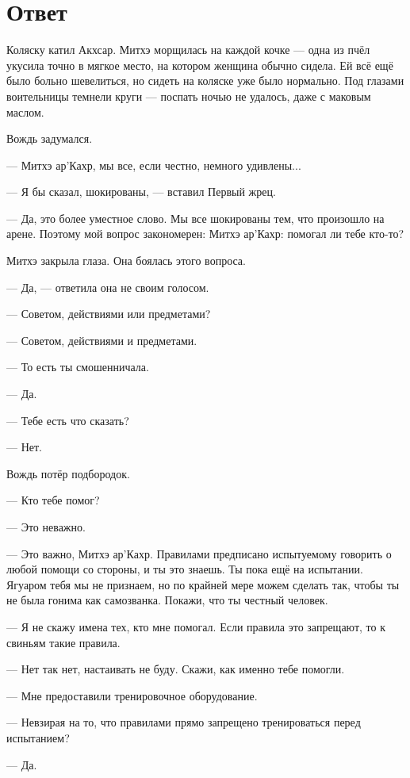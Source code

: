 \section{Ответ}

Коляску катил Акхсар.
Митхэ морщилась на каждой кочке --- одна из пчёл укусила точно в мягкое место, на котором женщина обычно сидела.
Ей всё ещё было больно шевелиться, но сидеть на коляске уже было нормально.
Под глазами воительницы темнели круги --- поспать ночью не удалось, даже с маковым маслом.

\textspace

Вождь задумался.

--- Митхэ ар'Кахр, мы все, если честно, немного удивлены...

--- Я бы сказал, шокированы, --- вставил Первый жрец.

--- Да, это более уместное слово.
Мы все шокированы тем, что произошло на арене.
Поэтому мой вопрос закономерен: Митхэ ар'Кахр: помогал ли тебе кто-то?

Митхэ закрыла глаза.
Она боялась этого вопроса.

--- Да, --- ответила она не своим голосом.

--- Советом, действиями или предметами?

--- Советом, действиями и предметами.

--- То есть ты смошенничала.

--- Да.

--- Тебе есть что сказать?

--- Нет.

Вождь потёр подбородок.

--- Кто тебе помог?

--- Это неважно.

--- Это важно, Митхэ ар'Кахр.
Правилами предписано испытуемому говорить о любой помощи со стороны, и ты это знаешь.
Ты пока ещё на испытании.
Ягуаром тебя мы не признаем, но по крайней мере можем сделать так, чтобы ты не была гонима как самозванка.
Покажи, что ты честный человек.

--- Я не скажу имена тех, кто мне помогал.
Если правила это запрещают, то к свиньям такие правила.

--- Нет так нет, настаивать не буду.
Скажи, как именно тебе помогли.

--- Мне предоставили тренировочное оборудование.

--- Невзирая на то, что правилами прямо запрещено тренироваться перед испытанием?

--- Да.

